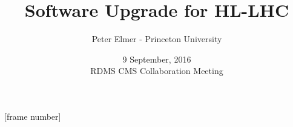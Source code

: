 \documentclass{beamer}
\title{Software Upgrade for HL-LHC}
\author{Peter Elmer - Princeton University}
\date{9 September, 2016 \\ RDMS CMS Collaboration Meeting}
\begin{document}
\maketitle

%
%

[frame number]














%














%
%



%

%



\end{document}
